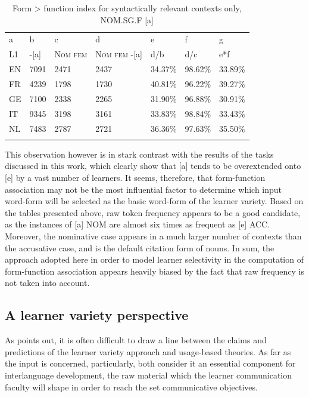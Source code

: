 \begin{table}
    \begin{tabularx}{\textwidth}{XXXXXXX}
        \lsptoprule
        a & b & c & d & e & f & g\\
        L1 & {}-[a] & \textsc{Nom} \textsc{fem} & \textsc{Nom} \textsc{fem} -[a] & d/b & d/c & e*f\\
        EN & 7091 & 2471 & 2437 & 34.37\% & 98.62\% & 33.89\%\\
        FR & 4239 & 1798 & 1730 & 40.81\% & 96.22\% & 39.27\%\\
        GE & 7100 & 2338 & 2265 & 31.90\% & 96.88\% & 30.91\%\\
        IT & 9345 & 3198 & 3161 & 33.83\% & 98.84\% & 33.43\%\\
        NL & 7483 & 2787 & 2721 & 36.36\% & 97.63\% & 35.50\%\\
        \lspbottomrule
    \end{tabularx}
    \caption{Form > function index for syntactically relevant contexts only, NOM.SG.F [a]}
    \label{tab:08:2}
\end{table}

This observation however is in stark contrast with the results of the tasks discussed in this work, which clearly show that [a] tends to be overextended onto [e] by a vast number of learners. It seems, therefore, that form-function association may not be the most influential factor to determine which input word-form will be selected as the basic word-form of the learner variety. Based on the tables presented above, raw token frequency appears to be a good candidate, as the instances of [a] NOM are almost six times as frequent as [e] ACC. Moreover, the nominative case appears in a much larger number of contexts than the accusative case, and is the default citation form of nouns. In sum, the approach adopted here in order to model learner selectivity in the computation of form-function association appears heavily biased by the fact that raw frequency is not taken into account. 

\subsection{A learner variety perspective}\label{sec:08:1.3}

As \citet{Dimroth2018} points out, it is often difficult to draw a line between the claims and predictions of the learner variety approach and usage-based theories. As far as the input is concerned, particularly, both consider it an essential component for interlanguage development, the raw material which the learner communication faculty will shape in order to reach the set communicative objectives.

